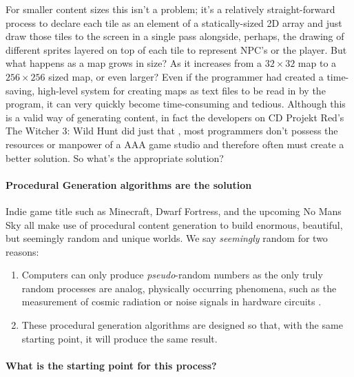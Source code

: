 \documentclass{article}
\begin{document}
For smaller content sizes this isn't a problem; it's a relatively straight-forward process to declare each tile as an element of a statically-sized 2D array and just draw those tiles to the screen in a single pass alongside, perhaps, the drawing of different sprites layered on top of each tile to represent NPC's or the player. But what happens as a map grows in size? As it increases from a $32 \times 32$ map to a $256 \times 256$ sized map, or even larger? Even if the programmer had created a time-saving, high-level system for creating maps as text files to be read in by the program, it can very quickly become time-consuming and tedious. Although this is a valid way of generating content, in fact the developers on CD Projekt Red's The Witcher 3: Wild Hunt did just that \parencite{witcher}, most programmers don't possess the resources or manpower of a AAA game studio and therefore often must create a better solution. So what's the appropriate solution?
		
\paragraph{Procedural Generation algorithms are the solution}\mbox{}
		
Indie game title such as Minecraft, Dwarf Fortress, and the upcoming No Mans Sky all make use of procedural content generation to build enormous, beautiful, but seemingly random and unique worlds. We say \emph{seemingly} random for two reasons:
\begin{enumerate}
\item
Computers can only produce \emph{pseudo}-random numbers as the only truly random processes are analog, physically occurring phenomena, such as the measurement of cosmic radiation or noise signals in hardware circuits \parencite{guneysu}.
\item
These procedural generation algorithms are designed so that, with the same starting point, it will produce the same result.
\end{enumerate}
		
\paragraph{What is the starting point for this process?}\mbox{}
		
\end{document}
